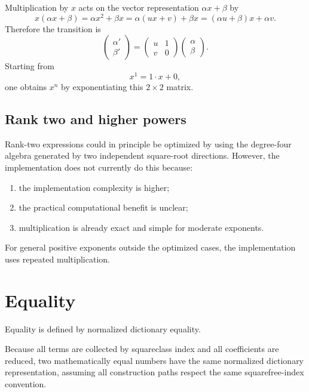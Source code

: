 \documentclass[11pt]{article}
\begin{document}
Multiplication by \(x\) acts on the vector representation \(\alpha x+\beta\) by
\begin{equation}
  x(\alpha x+\beta)=\alpha x^2+\beta x
  =\alpha(ux+v)+\beta x
  =(\alpha u+\beta)x+\alpha v.
\end{equation}
Therefore the transition is
\begin{equation}
  \begin{pmatrix}
  \alpha'\\
  \beta'
  \end{pmatrix}
  =
  \begin{pmatrix}
  u & 1\\
  v & 0
  \end{pmatrix}
  \begin{pmatrix}
  \alpha\\
  \beta
  \end{pmatrix}.
\end{equation}
Starting from
\begin{equation}
  x^1 = 1\cdot x + 0,
\end{equation}
one obtains \(x^n\) by exponentiating this \(2\times2\) matrix.

\subsection{Rank two and higher powers}

Rank-two expressions could in principle be optimized by using the degree-four algebra generated by two independent square-root directions. However, the implementation does not currently do this because:
\begin{enumerate}[label=\arabic*.]
  \item the implementation complexity is higher;
  \item the practical computational benefit is unclear;
  \item multiplication is already exact and simple for moderate exponents.
\end{enumerate}

For general positive exponents outside the optimized cases, the implementation uses repeated multiplication.

\section{Equality}

Equality is defined by normalized dictionary equality.

Because all terms are collected by squareclass index and all coefficients are reduced, two mathematically equal numbers have the same normalized dictionary representation, assuming all construction paths respect the same squarefree-index convention.
\end{document}
